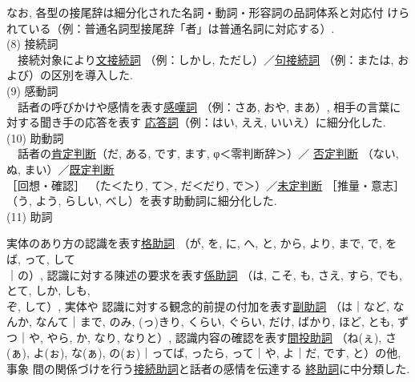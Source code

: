  なお, 各型の接尾辞は細分化された名詞・動詞・形容詞の品詞体系と対応付
けられている（例：普通名詞型接尾辞「者」は普通名詞に対応する）. \\
(8) 接続詞\\
~~接続対象により\underline{文接続詞}
（例：しかし, ただし）／\underline{句接続詞}
（例：または, および）の区別を導入した. \\
(9) 感動詞\\
~~話者の呼びかけや感情を表す\underline{感嘆詞}
（例：さあ, おや, まあ）, 相手の言葉に対する聞き手の応答を表す
\underline{応答詞}（例：はい, ええ, いいえ）に細分化した. \\
(10) 助動詞\\
~~話者の\hspace*{-0.2mm}\underline{肯定判断}\hspace*{-0.2mm}（だ, ある, です, ます, φ＜零判断辞＞）／
\hspace*{-0.2mm}\underline{否定判断}\hspace*{-0.2mm}
（ない, ぬ, まい）／\hspace*{-0.2mm}\underline{既定判断}\\［回想・確認］
（た＜たり, て＞, だ＜だり, で＞）／\underline{未定判断}
［推量・意志］（う, よう, らしい, べし）を表す助動詞に細分化した. \\
(11) 助詞

実体のあり方の認識を表す\hspace*{-0.2mm}\underline{格助詞}
（が, を, に, へ, と, から, より, まで, 
で, をば, って, して\\｜の）, 認識に対する陳述の要求を表す\hspace*{-0.2mm}\underline{係助詞}
（は, こそ, も, さえ, すら, でも, とて, しか, しも, \\ぞ, して）, 実体や
認識に対する観念的前提の付加を表す\underline{副助詞}
（は｜など, なんか, なんて｜まで, のみ,
(っ)きり, くらい, ぐらい, だけ, ばかり, ほど, とも, ずつ｜や, やら, か, 
なり, なりと）, 認識内容の確認を表す\underline{間投助詞}
（ね(ぇ), さ(ぁ), よ(ぉ), 
な(ぁ), の(ぉ)｜ってば, ったら, って｜や, よ｜だ, です, と）の他, 事象
間の関係づけを行う\underline{接続助詞}と話者の感情を伝達する
\underline{終助詞}に中分類した. 

